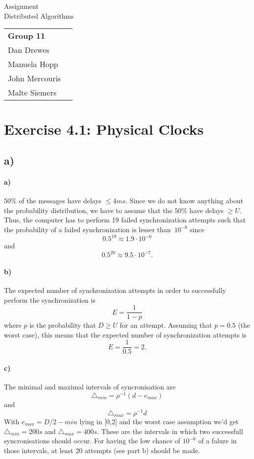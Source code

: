 \documentclass[12pt,a4paper]{article}
\begin{document}
\begin{center}
  \Large Assignment  \\
  \large Distributed Algorithms
\end{center}
\begin{flushright}
  \begin{tabular}{ll}
    \textbf{Group 11} \\
    Dan Drewes        \\ 
    Manuela Hopp      \\ 
    John Mercouris    \\
    Malte Siemers     \\
  \end{tabular} 
\end{flushright}


\section*{Exercise 4.1: Physical Clocks}
  \subsection*{a)} %
  	\paragraph{a)} $50\%$ of the messages have delays $\leq 4ms$. Since we do not know anything about the probability distribution, we have to assume that the $50\%$ have delays $\geq U$. Thus, the computer has to perform 19 failed synchronization attempts such that the probability of a failed synchronization is lesser than~$10^{-6}$ since
  	\[0.5^{19} \approx 1.9 \cdot 10^{-6} \] 
  	and 
  	\[ 0.5^{20} \approx 9.5 \cdot 10^{-7} .\]
  	\paragraph{b)} The expected number of synchronization attempts in order to successfully perform the synchronization is 
  	\[ E = \frac{1}{1-p} \]
  	where $p$ is the probability that $D \geq U$ for an attempt. Assuming that $p=0.5$ (the worst case), this means that the expected number of synchronization attempts is
  	\[ E = \frac{1}{0.5} = 2 .\]
  	\paragraph{c)}
  	The minimal and maximal intervals of syncronisation are
  	\[\triangle_{min} = \rho^{-1}(d-e_{max}) \] and
  	\[\triangle_{max} = \rho^{-1}d\]
  	With $e_{max} = D/2 - min$ lying in [0,2] and the worst case assumption we'd get $\triangle_{min} = 200s$ and $\triangle_{max} = 400s$. These are the intervals in which two successfull syncronisations should occur. For having the low chance of $10^{-6}$ of a falure in those intervals, at least 20 attempts (see part b) should be made.
\end{document}
